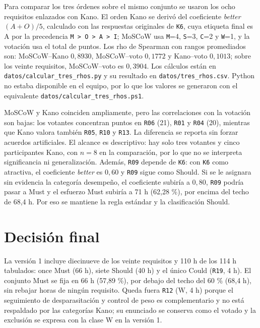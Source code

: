 \documentclass[11pt,a4paper]{article}
\begin{document}


Para comparar los tres órdenes sobre el mismo conjunto se usaron los ocho requisitos enlazados con Kano. El orden Kano se derivó del coeficiente \emph{better} $(A+O)/5$, calculado con las respuestas originales de \texttt{K6}, cuya etiqueta final es A por la precedencia \texttt{M > O > A > I}; MoSCoW usa \texttt{M}=4, \texttt{S}=3, \texttt{C}=2 y \texttt{W}=1, y la votación usa el total de puntos. Los rho de Spearman con rangos promediados son: MoSCoW--Kano $0{,}8930$, MoSCoW--voto $0{,}1772$ y Kano--voto $0{,}1013$; sobre los veinte requisitos, MoSCoW--voto es $0{,}3904$. Los cálculos están en \texttt{datos/calcular\_tres\_rhos.py} y su resultado en \texttt{datos/tres\_rhos.csv}. Python no estaba disponible en el equipo, por lo que los valores se generaron con el equivalente \texttt{datos/calcular\_tres\_rhos.ps1}.

MoSCoW y Kano coinciden ampliamente, pero las correlaciones con la votación son bajas: los votantes concentran puntos en \texttt{R06} (21), \texttt{R01} y \texttt{R04} (20), mientras que Kano valora también \texttt{R05}, \texttt{R10} y \texttt{R13}. La diferencia se reporta sin forzar acuerdos artificiales. El alcance es descriptivo: hay solo tres votantes y cinco participantes Kano, con $n=8$ en la comparación, por lo que no se interpreta significancia ni generalización. Además, \texttt{R09} depende de \texttt{K6}: con \texttt{K6} como atractiva, el coeficiente \emph{better} es $0{,}60$ y \texttt{R09} sigue como Should. Si se le asignara sin evidencia la categoría desempeño, el coeficiente subiría a $0{,}80$, \texttt{R09} podría pasar a Must y el esfuerzo Must subiría a 71 h (62,28 \%), por encima del techo de 68,4 h. Por eso se mantiene la regla estándar y la clasificación Should.

\section{Decisión final}
La versión 1 incluye diecinueve de los veinte requisitos y 110 h de los 114 h tabulados: once Must (66 h), siete Should (40 h) y el único Could (\texttt{R19}, 4 h). El conjunto Must se fija en 66 h (57,89 \%), por debajo del techo del 60 \% (68,4 h), sin rebajar horas de ningún requisito. Queda fuera \texttt{R12} (W, 4 h) porque el seguimiento de desparasitación y control de peso es complementario y no está respaldado por las categorías Kano; su enunciado se conserva como el votado y la exclusión se expresa con la clase W en la versión 1.
\end{document}
